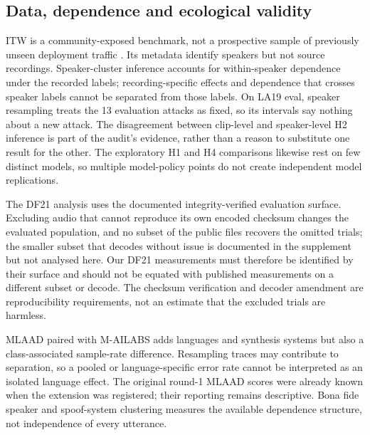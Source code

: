 \subsection{Data, dependence and ecological validity}
ITW is a community-exposed benchmark, not a prospective sample of previously unseen deployment traffic
\citep{muller22_in_the_wild}. Its metadata identify speakers but not source recordings. Speaker-cluster inference
accounts for within-speaker dependence under the recorded labels; recording-specific effects and dependence that
crosses speaker labels cannot be separated from those labels. On LA19 eval, speaker resampling treats the 13
evaluation attacks as fixed, so its intervals say nothing about a new attack. The disagreement between clip-level and
speaker-level H2 inference is part of the audit's evidence, rather than a reason to substitute one result for the
other. The exploratory H1 and H4 comparisons likewise rest on few distinct models, so multiple model-policy points do
not create independent model replications.

The DF21 analysis uses the documented integrity-verified evaluation surface. Excluding audio that cannot reproduce
its own encoded checksum changes the evaluated population, and no subset of the public files recovers the omitted
trials; the smaller subset that decodes without issue is documented in the supplement but not analysed here. Our DF21
measurements must therefore be identified by their surface and should not be equated with published measurements on a
different subset or decode. The checksum verification and decoder amendment are reproducibility requirements, not an
estimate that the excluded trials are harmless.

MLAAD paired with M-AILABS adds languages and synthesis systems but also a class-associated sample-rate difference.
Resampling traces may contribute to separation, so a pooled or language-specific error rate cannot be interpreted
as an isolated language effect. The original round-1 MLAAD scores were already known when the extension was
registered; their reporting remains descriptive. Bona fide speaker and spoof-system clustering measures the
available dependence structure, not independence of every utterance.

